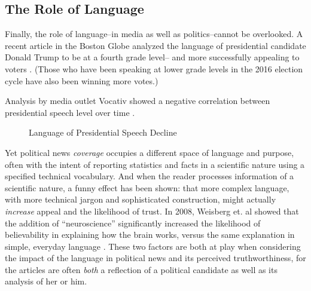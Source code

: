 \subsection{The Role of Language}
Finally, the role of language--in media as well as politics--cannot be overlooked. A recent article in the Boston Globe analyzed the language of presidential candidate Donald Trump to be at a fourth grade level-- and more successfully appealing to voters \cite{Globe-language-article}. (Those who have been speaking at lower grade levels in the 2016 election cycle have also been winning more votes.)

Analysis by media outlet Vocativ showed a negative correlation between presidential speech level over time \cite{Vocativ-speech}.

\begin{figure}[h!] 
\centering
  \caption{Language of Presidential Speech Decline}
\end{figure}

Yet political news \emph{coverage} occupies a different space of language and purpose, often with the intent of reporting statistics and facts in a scientific nature using a specified technical vocabulary. And when the reader processes information of a scientific nature, a funny effect has been shown: that more complex language, with more technical jargon and sophisticated construction, might actually \emph{increase} appeal and the likelihood of trust. In 2008, Weisberg et. al showed that the addition of ``neuroscience'' significantly increased the likelihood of believability in explaining how the brain works, versus the same explanation in simple, everyday language \cite{weisberg2008seductive}. These two factors are both at play when considering the impact of the language in political news and its perceived truthworthiness, for the articles are often \emph{both} a reflection of a political candidate as well as its analysis of her or him.




















